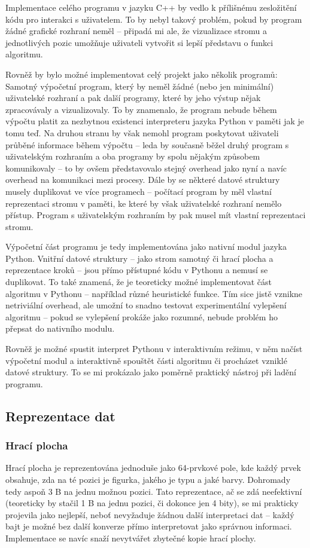 \documentclass{article}
\begin{document}
Implementace celého programu v jazyku C++ by vedlo k přílišnému zesložitění kódu pro interakci s uživatelem. To by nebyl
takový problém, pokud by program žádné grafické rozhraní neměl -- připadá mi ale, že vizualizace stromu a jednotlivých
pozic umožňuje uživateli vytvořit si lepší představu o funkci algoritmu.

Rovněž by bylo možné implementovat celý projekt jako několik programů: Samotný výpočetní program, který by neměl žádné
(nebo jen minimální) uživatelské rozhraní a pak další programy, které by jeho výstup nějak zpracovávaly a vizualizovaly.
To by znamenalo, že program nebude během výpočtu platit za nezbytnou existenci interpreteru jazyka Python v paměti jak
je tomu teď. Na druhou stranu by však nemohl program poskytovat uživateli průběné informace během výpočtu -- leda by
současně běžel druhý program s uživatelským rozhraním a oba programy by spolu nějakým způsobem komunikovaly -- to by
ovšem představovalo stejný overhead jako nyní a navíc overhead na komunikaci mezi procesy. Dále by se některé datové
struktury musely duplikovat ve více programech -- počítací program by měl vlastní reprezentaci stromu v paměti, ke které
by však uživatelské rozhraní nemělo přístup. Program s uživatelským rozhraním by pak musel mít vlastní reprezentaci
stromu.

Výpočetní část programu je tedy implementována jako nativní modul jazyka Python. Vnitřní datové struktury -- jako strom
samotný či hrací plocha a reprezentace kroků -- jsou přímo přístupné kódu v Pythonu a nemusí se duplikovat. To také
znamená, že je teoreticky možné implementovat část algoritmu v Pythonu -- například různé heuristické funkce. Tím sice
jistě vznikne netriviální overhead, ale umožní to snadno testovat experimentální vylepšení algoritmu -- pokud se
vylepšení prokáže jako rozumné, nebude problém ho přepsat do nativního modulu.

Rovněž je možné spustit interpret Pythonu v interaktivním režimu, v něm načíst výpočetní modul a interaktivně spouštět
části algoritmu či procházet vzniklé datové struktury. To se mi prokázalo jako poměrně praktický nástroj při ladění
programu.

\subsection{Reprezentace dat}
\subsubsection{Hrací plocha}
Hrací plocha je reprezentována jednoduše jako 64-prvkové pole, kde každý prvek obsahuje, zda na té pozici je figurka,
jakého je typu a jaké barvy. Dohromady tedy aspoň 3 B na jednu možnou pozici. Tato reprezentace, ač se zdá neefektivní
(teoreticky by stačil 1 B na jednu pozici, či dokonce jen 4 bity), se mi prakticky projevila jako nejlepší, neboť
nevyžaduje žádnou další interpretaci dat -- každý bajt je možné bez další konverze přímo interpretovat jako správnou
informaci. Implementace se navíc snaží nevytvářet zbytečné kopie hrací plochy.
\end{document}
